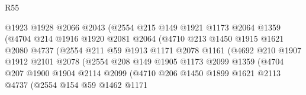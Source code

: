 \begin{lexlean}{R55}
\begin{coremodule}
                            @1923
                            @1928
                            @2066
                            @2043
                            (@2554
                              @215
                              @149
                              @1921
                              @1173
                              @2064
                              @1359
                              (@4704
                                @214
                                @1916
                                @1920
                                @2081
                                @2064
                                (@4710
                                  @213
                                  @1450
                                  @1915
                                  @1621
                                  @2080
                                  @4737
                                  (@2554
                                    @211
                                    @59
                                    @1913
                                    @1171
                                    @2078
                                    @1161
                                    (@4692
                                      @210
                                      @1907
                                      @1912
                                      @2101
                                      @2078
                                      (@2554
                                        @208
                                        @149
                                        @1905
                                        @1173
                                        @2099
                                        @1359
                                        (@4704
                                          @207
                                          @1900
                                          @1904
                                          @2114
                                          @2099
                                          (@4710
                                            @206
                                            @1450
                                            @1899
                                            @1621
                                            @2113
                                            @4737
                                            (@2554
                                              @154
                                              @59
                                              @1462
                                              @1171

\end{coremodule}
\end{lexlean}
